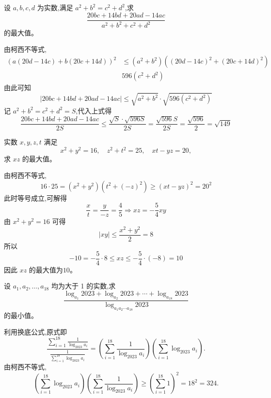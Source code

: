 \begin{questions}
    \question 设 $a, b, c, d$ 为实数,满足 $a^2 + b^2 = c^2 + d^2$,求
    \[
    \frac{20bc + 14bd + 20ad - 14ac}{a^2 + b^2 + c^2 + d^2}
    \]
    的最大值。
    \begin{solution}
        由柯西不等式,
        \begin{align*}
        (a(20d - 14c) + b(20c + 14d))^2 
        &\le (a^2 + b^2)((20d - 14c)^2 + (20c + 14d)^2)\\
        &596(c^2 + d^2)
        \end{align*}
        由此可知
        \[
        |20bc + 14bd + 20ad - 14ac| \le \sqrt{a^2 + b^2} \cdot \sqrt{596(c^2 + d^2)}
        \]
        记 $a^2 + b^2 = c^2 + d^2 = S$,代入上式得
        \[
        \frac{20bc + 14bd + 20ad - 14ac}{2S} \le \frac{\sqrt{S} \cdot \sqrt{596S}}{2S} = \frac{\sqrt{596}S}{2S} = \frac{\sqrt{596}}{2}=\sqrt{149}
        \]
    \end{solution}

    \question 实数 $x,y,z,t$ 满足
    \[
    x^2+y^2=16,\quad z^2+t^2=25,\quad xt-yz=20,
    \]
    求 $xz$ 的最大值。
    \begin{solution}
        由柯西不等式,
        \[
        16\cdot 25=(x^2+y^2)(t^2+(-z)^2)\ge (xt-yz)^2=20^2
        \]
        此时等号成立,可解得
        \[
        \frac{x}{t}=\frac{y}{-z}=\frac{4}{5} \Rightarrow xz=-\frac{5}{4}xy
        \]
        由 $x^2+y^2=16$ 可得
        \[
        |xy|\le \frac{x^2+y^2}{2}=8
        \]
        所以
        \[
        -10= -\frac{5}{4}\cdot 8 \le xz \le -\frac{5}{4}\cdot(-8) =10
        \]
        因此 $x z$ 的最大值为$10$。
    \end{solution}

    \question 设 \(a_1,a_2,\dots,a_{18}\) 均为大于 1 的实数,求  
    \[
    \frac{\log_{a_1} 2023 + \log_{a_2} 2023 + \cdots + \log_{a_{18}} 2023}{\log_{a_1 a_2 \cdots a_{18}} 2023}
    \]
    的最小值。
    \begin{solution}
        利用换底公式,原式即
        \[
        \frac{\sum_{i=1}^{18} \frac{1}{\log_{2023} a_i}}{\frac{1}{\sum_{i=1}^{18} \log_{2023} a_i}} 
        = \left(\sum_{i=1}^{18} \frac{1}{\log_{2023} a_i}\right) \left(\sum_{i=1}^{18} \log_{2023} a_i\right).
        \]
        由柯西不等式,
        \[
        \left(\sum_{i=1}^{18} \log_{2023} a_i\right) \left(\sum_{i=1}^{18} \frac{1}{\log_{2023} a_i}\right) \ge \left(\sum_{i=1}^{18} 1\right)^2 = 18^2 = 324.
        \]
    \end{solution}


\end{questions}
